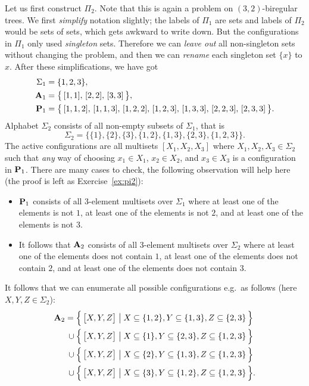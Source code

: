 Let us first construct $\Pi_2$. Note that this is again a problem on $(3,2)$-biregular trees. We first \emph{simplify} notation slightly; the labels of $\Pi_1$ are sets and labels of $\Pi_2$ would be sets of sets, which gets awkward to write down. But the configurations in $\Pi_1$ only used \emph{singleton} sets. Therefore we can \emph{leave out} all non-singleton sets without changing the problem, and then we can \emph{rename} each singleton set $\{ x \}$ to $x$. After these simplifications, we have got
\begin{align*}
	\Sigma_1 &= \{ 1,2,3 \}, \\
	\mathbf{A}_1 &= \bigl\{\,
		[ 1, 1 ],\,
		[ 2, 2 ],\,
		[ 3, 3 ]
	\,\bigr\}, \\ 
	\mathbf{P}_1 &= \bigl\{\,
		[ 1, 1, 2 ],\,
		[ 1, 1, 3 ],\,
		[ 1, 2, 2 ],\,
		[ 1, 2, 3 ],\,
		[ 1, 3, 3 ],\,
		[ 2, 2, 3 ],\,
		[ 2, 3, 3 ]
	\,\bigr\}.
\end{align*}
Alphabet $\Sigma_2$ consists of all non-empty subsets of $\Sigma_1$, that is 
\[
	\Sigma_2 = \bigl\{ \{ 1 \}, \{ 2 \}, \{ 3 \}, \{ 1, 2 \}, \{ 1, 3 \}, \{ 2, 3 \}, \{ 1, 2, 3 \} \bigr\}.
\]
The active configurations are all multisets $[X_1, X_2, X_3]$ where $X_1,X_2,X_3 \in \Sigma_2$ such that \emph{any} way of choosing $x_1 \in X_1$, $x_2 \in X_2$, and $x_3 \in X_3$ is a configuration in $\mathbf{P}_1$. There are many cases to check, the following observation will help here (the proof is left as Exercise~\ref{ex:pi2}):
\begin{itemize}
	\item $\mathbf{P}_1$ consists of all $3$-element multisets over $\Sigma_1$ where at least one of the elements is not $1$, at least one of the elements is not $2$, and at least one of the elements is not $3$.
	\item It follows that $\mathbf{A}_2$ consists of all $3$-element multisets over $\Sigma_2$ where at least one of the elements does not contain $1$, at least one of the elements does not contain $2$, and at least one of the elements does not contain $3$.
\end{itemize}
It follows that we can enumerate all possible configurations e.g.\ as follows (here $X,Y,Z \in \Sigma_2$):
\begin{equation}\label{eq:pi2}
\begin{split}
	\mathbf{A}_2
	      = {} &\Bigl\{ \, \bigl[ X, Y, Z \bigr] \bigm| X \subseteq \{1, 2\}, Y \subseteq \{ 1, 3 \}, Z \subseteq \{ 2, 3 \} \,\Bigr\} \\
	{} \cup {} &\Bigl\{ \, \bigl[ X, Y, Z \bigr] \bigm| X \subseteq \{1\}, Y \subseteq \{ 2, 3 \}, Z \subseteq \{ 1, 2, 3 \} \,\Bigr\} \\
	{} \cup {} &\Bigl\{ \, \bigl[ X, Y, Z \bigr] \bigm| X \subseteq \{2\}, Y \subseteq \{ 1, 3 \}, Z \subseteq \{ 1, 2, 3 \} \,\Bigr\} \\
	{} \cup {} &\Bigl\{ \, \bigl[ X, Y, Z \bigr] \bigm| X \subseteq \{3\}, Y \subseteq \{ 1, 2 \}, Z \subseteq \{ 1, 2, 3 \} \,\Bigr\}.
\end{split}
\end{equation}
